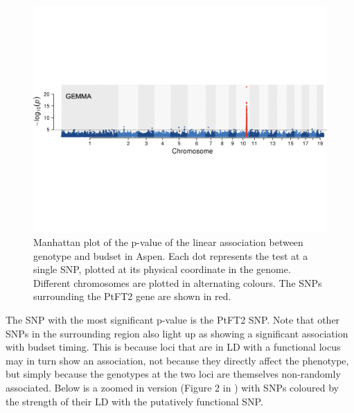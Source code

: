 \begin{figure}
\begin{center}
\includegraphics[width=\textwidth]{Journal_figs/Quant_gen/Wang_GWAS_poplar/Wang_Fig_just_Manhattan.pdf}
\end{center}

\caption{Manhattan plot of the p-value of the linear association
  between genotype and budset in Aspen. Each dot represents the test at a single SNP,
  plotted at its physical coordinate in the genome. Different chromosomes
  are plotted in alternating colours. The SNPs surrounding the PtFT2
  gene are shown in red.} \label{fig:Apsen_Manhattan}
\end{figure}
The SNP with the most significant p-value is the PtFT2 SNP. Note
that other SNPs in the surrounding region also light up as showing a
significant association with budset timing. This is because loci that are in LD with a functional locus may in turn show an
association, not because they directly affect the phenotype, but simply
because the genotypes at the two loci are themselves non-randomly
associated. Below is a zoomed in version (Figure 2 in \citet{wang:18}) with SNPs coloured by the
strength of their LD with the putatively functional SNP.

